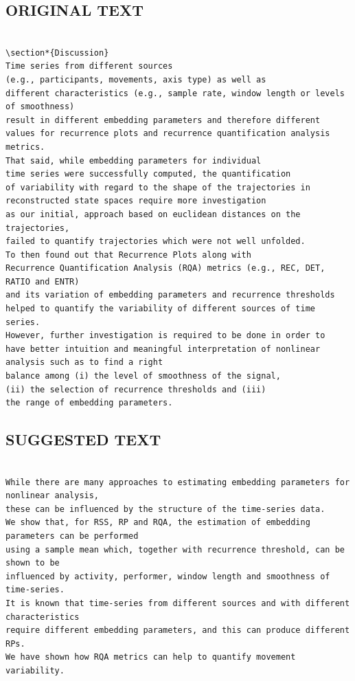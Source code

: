 \documentclass[10pt]{article}
\begin{document}
\subsection{ORIGINAL TEXT}
\begin{verbatim}

\section*{Discussion}
Time series from different sources  
(e.g., participants, movements, axis type) as well as
different characteristics (e.g., sample rate, window length or levels of smoothness) 
result in different embedding parameters and therefore different 
values for recurrence plots and recurrence quantification analysis metrics.
That said, while embedding parameters for individual
time series were successfully computed, the quantification 
of variability with regard to the shape of the trajectories in 
reconstructed state spaces require more investigation
as our initial, approach based on euclidean distances on the trajectories, 
failed to quantify trajectories which were not well unfolded. 
To then found out that Recurrence Plots along with 
Recurrence Quantification Analysis (RQA) metrics (e.g., REC, DET, RATIO and ENTR) 
and its variation of embedding parameters and recurrence thresholds 
helped to quantify the variability of different sources of time series.
However, further investigation is required to be done in order to 
have better intuition and meaningful interpretation of nonlinear 
analysis such as to find a right 
balance among (i) the level of smoothness of the signal, 
(ii) the selection of recurrence thresholds and (iii) 
the range of embedding parameters. 

\end{verbatim}

\subsection{SUGGESTED TEXT}
\begin{verbatim}

While there are many approaches to estimating embedding parameters for nonlinear analysis, 
these can be influenced by the structure of the time-series data.   
We show that, for RSS, RP and RQA, the estimation of embedding parameters can be performed 
using a sample mean which, together with recurrence threshold, can be shown to be 
influenced by activity, performer, window length and smoothness of time-series.  
It is known that time-series from different sources and with different characteristics 
require different embedding parameters, and this can produce different RPs.  
We have shown how RQA metrics can help to quantify movement variability.

\end{verbatim}
\end{document}
